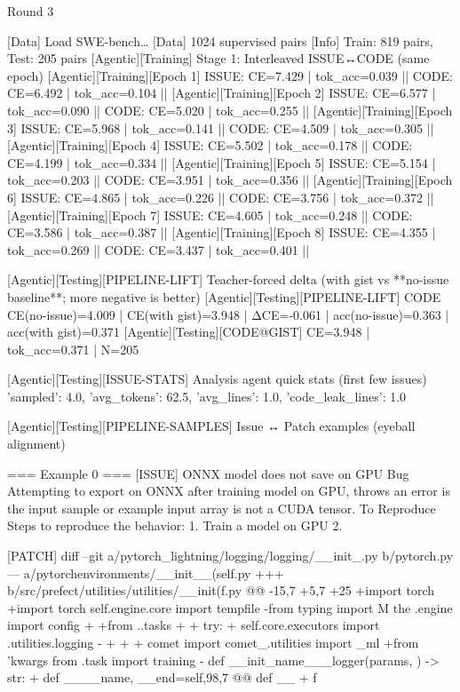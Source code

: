  Round 3
 
 [Data] Load SWE-bench…
 [Data] 1024 supervised pairs
 [Info] Train: 819 pairs, Test: 205 pairs
 [Agentic][Training] Stage 1: Interleaved ISSUE↔CODE (same epoch)
 [Agentic][Training][Epoch 1] ISSUE: CE=7.429 | tok_acc=0.039  ||  CODE: CE=6.492 | tok_acc=0.104  ||  
 [Agentic][Training][Epoch 2] ISSUE: CE=6.577 | tok_acc=0.090  ||  CODE: CE=5.020 | tok_acc=0.255  ||  
 [Agentic][Training][Epoch 3] ISSUE: CE=5.968 | tok_acc=0.141  ||  CODE: CE=4.509 | tok_acc=0.305  ||  
 [Agentic][Training][Epoch 4] ISSUE: CE=5.502 | tok_acc=0.178  ||  CODE: CE=4.199 | tok_acc=0.334  ||  
 [Agentic][Training][Epoch 5] ISSUE: CE=5.154 | tok_acc=0.203  ||  CODE: CE=3.951 | tok_acc=0.356  ||  
 [Agentic][Training][Epoch 6] ISSUE: CE=4.865 | tok_acc=0.226  ||  CODE: CE=3.756 | tok_acc=0.372  ||  
 [Agentic][Training][Epoch 7] ISSUE: CE=4.605 | tok_acc=0.248  ||  CODE: CE=3.586 | tok_acc=0.387  ||  
 [Agentic][Training][Epoch 8] ISSUE: CE=4.355 | tok_acc=0.269  ||  CODE: CE=3.437 | tok_acc=0.401  ||  
 
 [Agentic][Testing][PIPELINE-LIFT] Teacher-forced delta (with gist vs **no-issue baseline**; more negative is better)
 [Agentic][Testing][PIPELINE-LIFT] CODE CE(no-issue)=4.009 | CE(with gist)=3.948 | ΔCE=-0.061 | acc(no-issue)=0.363 | acc(with gist)=0.371
 [Agentic][Testing][CODE@GIST] CE=3.948 | tok_acc=0.371 | N=205
 
 [Agentic][Testing][ISSUE-STATS] Analysis agent quick stats (first few issues)
 {'sampled': 4.0, 'avg_tokens': 62.5, 'avg_lines': 1.0, 'code_leak_lines': 1.0}
 
 [Agentic][Testing][PIPELINE-SAMPLES] Issue ↔ Patch examples (eyeball alignment)
 
 === Example 0 ===
 [ISSUE]
 ONNX model does not save on GPU Bug Attempting to export on ONNX after training model on GPU, throws an error is the input sample or example input array is not a CUDA tensor. To Reproduce Steps to reproduce the behavior: 1. Train a model on GPU 2.
 
 [PATCH]
 diff --git a/pytorch_lightning/logging/logging/__init_.py b/pytorch.py --- a/pytorchenvironments/__init__(self.py +++ b/src/prefect/utilities/utilities/__init(f.py @@ -15,7 +5,7 +25 +import torch +import torch self.engine.core import tempfile -from typing import M the .engine import config + +from ..tasks + + try: + self.core.executors import .utilities.logging - + + + comet import comet_.utilities import _ml +from 'kwargs from .task import training - def __init_name___logger(params, ) -> str: + def ____name, __end=self,98,7 @@ def __ + f
 

